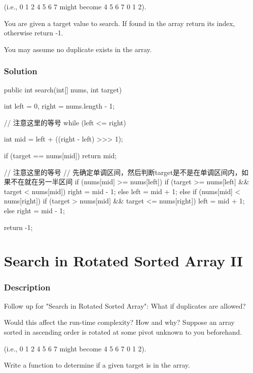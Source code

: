 (i.e., 0 1 2 4 5 6 7 might become 4 5 6 7 0 1 2).

You are given a target value to search. If found in the array return its index, otherwise return -1.

You may assume no duplicate exists in the array.

\subsubsection{Solution}

\begin{Code}
public int search(int[] nums, int target) {
    int left = 0, right = nums.length - 1;

    // 注意这里的等号
    while (left <= right) {
        int mid = left + ((right - left) >>> 1);

        if (target == nums[mid]) {
            return mid;
        }

        // 注意这里的等号
        // 先确定单调区间，然后判断target是不是在单调区间内，如果不在就在另一半区间
        if (nums[mid] >= nums[left]) {
            if (target >= nums[left] && target < nums[mid]) {
                right = mid - 1;
            } else {
                left = mid + 1;
            }
        } else if (nums[mid] < nums[right]) {
            if (target > nums[mid] && target <= nums[right]) {
                left = mid + 1;
            } else {
                right = mid - 1;
            }
        }
    }

    return -1;
}
\end{Code}

\newpage

\section{Search in Rotated Sorted Array II} %

\subsubsection{Description}
Follow up for "Search in Rotated Sorted Array":
What if duplicates are allowed?

Would this affect the run-time complexity? How and why?
Suppose an array sorted in ascending order is rotated at some pivot unknown to you beforehand.

(i.e., 0 1 2 4 5 6 7 might become 4 5 6 7 0 1 2).

Write a function to determine if a given target is in the array.

